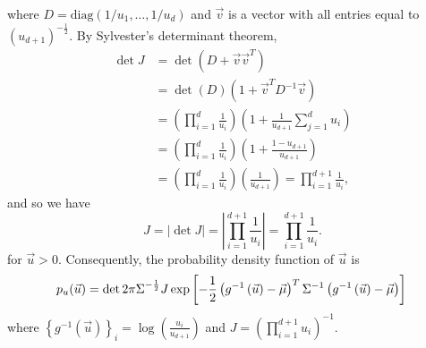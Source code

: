 \documentclass[11pt]{article}
\newcommand{\diag}[1]{\mathrm{diag}\left(#1\right)}
\newcommand{\pars}[1]{\left(#1\right)}
\newcommand{\vect}[1]{\vec{#1}}  %
\newcommand{\setof}[1]{\left\{#1\right\}}  %
\newcommand{\matr}[1]{#1}  %
\newcommand{\abs}[1]{\left|#1\right|}  %
\newcommand{\tp}[1]{#1^T}  %
\newcommand{\inv}[1]{{#1}^{-1}}  %
\newcommand{\bracks}[1]{\left[#1\right]}  %
\begin{document}
where $\matr{D} = \diag{1/u_1,\dotsc,1/u_d}$ and $\vect{v}$ is a vector with all entries equal to $\pars{u_{d+1}}^{-\frac{1}{2}}$.  By Sylvester's determinant theorem, 
\begin{equation}
	\begin{split}
		\det{\matr{J}} & = \det{(\matr{D} + \vect{v}\tp{\vect{v}})} \\
		& = \det{(\matr{D})}\pars{1 + \tp{\vect{v}}\inv{\matr{D}}\vect{v}} \\
		& = \pars{\prod_{i=1}^d \frac{1}{u_i}}\pars{1 + \frac{1}{u_{d+1}}\sum_{j=1}^{d} u_i} \\
		& = \pars{\prod_{i=1}^d \frac{1}{u_i}}\pars{1 + \frac{1 - u_{d+1}}{u_{d+1}}} \\
		& = \pars{\prod_{i=1}^d \frac{1}{u_i}}\pars{\frac{1}{u_{d+1}}} = \prod_{i=1}^{d+1} \frac{1}{u_i},
	\end{split}
\end{equation}
and so we have
\begin{equation}
	J = \abs{\det{\matr{J}}} = \abs{\prod_{i=1}^{d+1} \frac{1}{u_i}} = \prod_{i=1}^{d+1} \frac{1}{u_i}.
\end{equation}
for $\vect{u} > 0$.  Consequently, the probability density function of $\vect{u}$ is 
\begin{equation}
	p_u(\vect{u}) = \det{2\pi \matr{\Sigma}}^{-\frac{1}{2}} J \exp
		\bracks{-\frac{1}{2}\tp{\pars{g^{-1}\pars{\vect{u}}-\vect{\mu}}}
		\matr{\Sigma}^{-1}\pars{g^{-1}\pars{\vect{u}}-\vect{\mu}}} \\
\end{equation}
where $\setof{g^{-1}(\vect{u})}_i = \log\pars{\frac{u_i}{u_{d+1}}}$ and $J = \pars{\prod_{i=1}^{d+1} u_i}^{-1}$.
\end{document}
